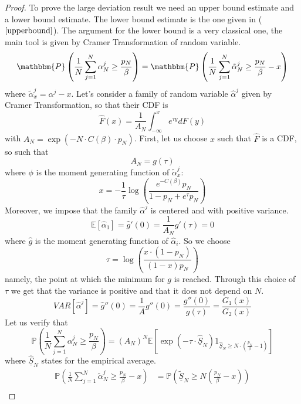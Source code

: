 \documentclass[11pt, a4paper]{article}
\begin{document}
\begin{proof}
To prove the large deviation result we need an upper bound estimate and a lower bound estimate. The lower bound estimate is the one given in ($\ref{upperbound}$). 
The argument for the lower bound is a very classical one, the main tool is given by Cramer Transformation of random variable. 
\begin{equation*}
\mathbbm{P} \left( \frac{1}{N} \sum_{j = 1}^N \alpha^{j}_N \geq \frac{p_N}{\beta} \right)=\mathbbm{P} \left( \frac{1}{N} \sum_{j = 1}^N \tilde{\alpha}^{j}_N \geq \frac{p_N}{\beta} -x\right)
\end{equation*}
where $\tilde{\alpha}^j_x=\alpha^j-x$. Let's consider a family of random variable $\hat{\alpha}^j$ given by Cramer Transformation, so that their CDF is 
\[\hat{F}(x)=\frac{1}{A_N}\int_{-\infty}^x e^{\tau y} dF(y)\]
with $A_N=\exp(-N\cdot C(\beta)\cdot p_N)$.
First, let us choose $x$ such that $\hat{F}$  is a CDF, so such that
\[  A_N= g(\tau)\]
where $\phi$ is the moment generating function of $\tilde{\alpha}^j_x$:
\[x=-\frac{1}{\tau}\log\left( \frac{e^{-C(\beta)}p_N}{1-p_N+e^\tau p_N}\right)\]
Moreover, we impose that the family $\hat{\alpha}^j$ is centered and with positive variance.
\begin{equation}
\mathbb{E}\left[  \hat{\alpha}_1\right]=\hat{g}'(0)=\frac{1}{A_N} g'(\tau)=0\label{mean}
\end{equation}
where $\hat{g}$ is the moment generating function of $\hat{\alpha}_i$.
So we choose
\[\tau=\log\left(\frac{x\cdot(1-p_N)}{(1-x)p_N}\right)\]
namely, the point at which the minimum for $g$ is reached.
Through this choice of $\tau$ we get that the variance is positive and that it does not depend on $N$.
\begin{equation}
VAR\left[\hat{\alpha}^j\right]=\hat{g}''(0)=\frac{1}{A} g''(0)=\frac{g''(0)}{g(\tau)}=\frac{G_1(x)}{G_2(x)}
\end{equation}\label{variance}
\todo{}
Let us verify that
\begin{equation}
\mathbb{P} \left( \frac{1}{N} \sum_{j = 1}^N \alpha^{j}_N \geq \frac{p_N}{\beta} \right)=(A_N)^N\mathbb{E}\left[\exp(-\tau\cdot \underline{\hat{S}}_N)1_{\underline{\hat{S}}_N\geq N\cdot(\frac{p_N}{\beta}-1)}\right]
\end{equation}
where $\underline{\hat{S}}_N$ states for the empirical average.
\begin{align*}
\mathbb{P} \left( \frac{1}{N} \sum_{j = 1}^N \tilde{\alpha}^{j}_N \geq \frac{p_N}{\beta}-x \right)&=
\mathbb{P} \left(\underline{\tilde{S}}_N \geq N\left(\frac{p_N}{\beta}-x\right) \right)\\

\end{align*}
\end{proof}
\end{document}
